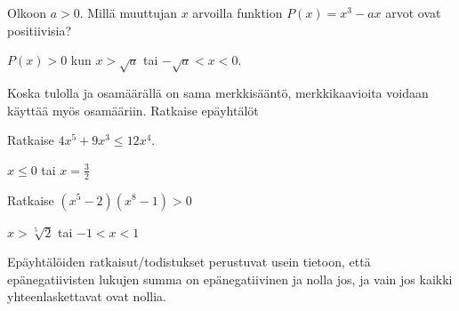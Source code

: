 \begin{tehtavasivu}
\begin{tehtava} %
Olkoon $a > 0$. Millä muuttujan $x$ arvoilla funktion
$P(x)=x^3-ax$ arvot ovat positiivisia?
    \begin{vastaus}
	$P(x)>0$ kun $x > \sqrt{a}$ tai $-\sqrt{a}<x<0$.
    \end{vastaus}
\end{tehtava}

\begin{tehtava}
    Koska tulolla ja osamäärällä on sama merkkisääntö, merkkikaavioita
	voidaan käyttää myös osamääriin. Ratkaise epäyhtälöt
    \begin{alakohdat}
    \end{alakohdat}
    \begin{vastaus}
        \begin{alakohdat}
    	\end{alakohdat}
    \end{vastaus}
\end{tehtava}


\begin{tehtava}
    Ratkaise $4x^5+9 x^3 \le 12 x^4$.
    \begin{vastaus}
        $x\le0$ tai $x=\frac{3}{2}$
    \end{vastaus}
\end{tehtava}

\begin{tehtava}
Ratkaise $(x^5-2)(x^8-1) >0$
\begin{vastaus}
$x > \sqrt[5]{2}$ tai $-1<x<1$
\end{vastaus}
\end{tehtava}

\begin{tehtava}
Epäyhtälöiden ratkaisut/todistukset perustuvat usein tietoon, että epänegatiivisten lukujen summa on epänegatiivinen ja nolla jos, ja vain jos kaikki yhteenlaskettavat ovat nollia.

\begin{alakohdat}
\end{alakohdat}


\end{tehtava}
\end{tehtavasivu}

